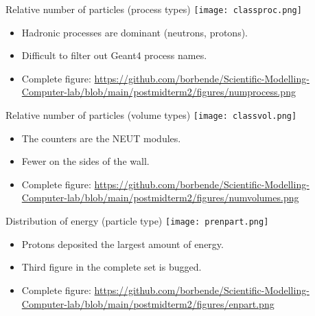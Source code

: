 \documentclass[11pt]{beamer}
\begin{document}
\begin{frame}{Relative number of particles (process types)}
    \centering
    \texttt{[image: classproc.png]}
    \begin{itemize}
    \vspace{0.2 cm}
        \item<tri@1-> Hadronic processes are dominant (neutrons, protons).
        \vspace{0.2 cm}
        \item<tri@1-> Difficult to filter out Geant4 process names.
        \vspace{0.2 cm}
        \item<tri@1-> Complete figure: \url{https://github.com/borbende/Scientific-Modelling-Computer-lab/blob/main/postmidterm2/figures/numprocess.png}
    \end{itemize}
\end{frame}

\begin{frame}{Relative number of particles (volume types)}
    \centering
    \texttt{[image: classvol.png]}
    \begin{itemize}
    \vspace{0.2 cm}
        \item<tri@1-> The counters are the NEUT modules.
        \vspace{0.2 cm}
        \item<tri@1-> Fewer on the sides of the wall.
        \vspace{0.2 cm}
        \item<tri@1-> Complete figure: \url{https://github.com/borbende/Scientific-Modelling-Computer-lab/blob/main/postmidterm2/figures/numvolumes.png}
    \end{itemize}
\end{frame}

\begin{frame}{Distribution of energy (particle type)}
        \centering
    \texttt{[image: prenpart.png]}
    \begin{itemize}
    \vspace{0.2 cm}
        \item<tri@1-> Protons deposited the largest amount of energy.
        \vspace{0.2 cm}
        \item<tri@1-> Third figure in the complete set is bugged.
        \vspace{0.2 cm}
        \item<tri@1-> Complete figure: \url{https://github.com/borbende/Scientific-Modelling-Computer-lab/blob/main/postmidterm2/figures/enpart.png}
    \end{itemize}
\end{frame}
\end{document}
